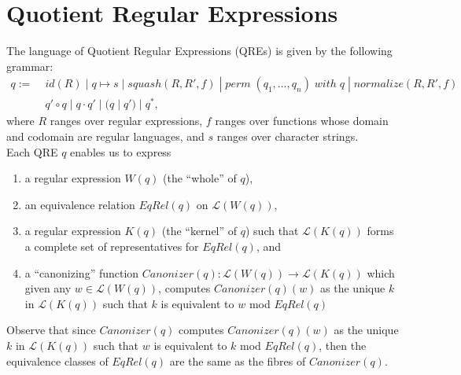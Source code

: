 \documentclass{svproc}
\begin{document}
\section{Quotient Regular Expressions}
The language of Quotient Regular Expressions (QREs) is given by the following
grammar:
\begin{align*}
q := \; &id(R) \; | \; q \mapsto s \; | \; squash (R, R', f) \; | \;
perm \; (q_1, \ldots, q_n) \; with \; q \; | \; normalize(R, R', f)\\
&q' \circ q \; | \; q \cdot q' \; | \; (q \; | \; q') \; | \; q^*,
\end{align*}
where $R$ ranges over regular expressions, $f$ ranges over functions whose
domain and codomain are regular languages, and $s$ ranges over character
strings.\\
Each QRE $q$ enables us to express
\begin{enumerate}
  \item a regular expression $W(q)$ (the ``whole'' of $q$),
  \item an equivalence relation $EqRel(q)$ on $\mathcal{L}(W(q))$,
  \item a regular expression $K(q)$ (the ``kernel'' of $q$)
  such that $\mathcal{L}(K(q))$ forms a complete set of representatives for
  $EqRel(q)$, and
  \item a ``canonizing'' function $Canonizer(q):\mathcal{L}(W(q))
  \longrightarrow \mathcal{L}(K(q))$ which given any $w \in \mathcal{L}(W(q))$,
  computes $Canonizer(q)(w)$ as the unique $k$ in $\mathcal{L}(K(q))$ such that
  $k$ is equivalent to $w$ mod $EqRel(q)$
\end{enumerate}
Observe that since $Canonizer(q)$ computes
$Canonizer(q)(w)$ as the unique $k$ in $\mathcal{L}(K(q))$ such that $w$ is
equivalent to $k$ mod $EqRel(q)$, then the equivalence classes of $EqRel(q)$
are the same as the fibres of $Canonizer(q)$.
\end{document}
